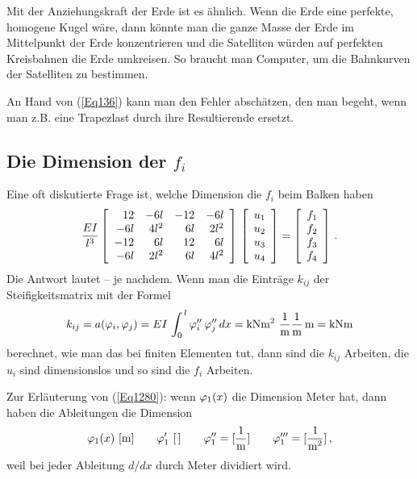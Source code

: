 Mit der Anziehungskraft der Erde ist es \"{a}hnlich. Wenn die Erde eine perfekte, homogene Kugel w\"{a}re, dann k\"{o}nnte man die ganze Masse der Erde im Mittelpunkt der Erde konzentrieren und die Satelliten w\"{u}rden auf perfekten Kreisbahnen die Erde umkreisen. So braucht man Computer, um die Bahnkurven der Satelliten zu bestimmen.

An Hand von (\ref{Eq136}) kann man den Fehler absch\"{a}tzen, den man begeht, wenn man z.B. eine Trapezlast durch ihre Resultierende ersetzt.

\textcolor{sectionTitleBlue}{\subsection{Die Dimension der $f_i$}}\label{Dimensionsbetrachtung}
Eine oft diskutierte Frage ist, welche Dimension die $f_i$ beim Balken haben
\begin{align}
 \frac{EI}{l^3} \left[
\begin{array}{r r r r}
 12 & -6l & -12 &-6l \\
 -6l & 4l^2 & 6l &2l^2 \\
 -12 & 6l & 12 & 6l \\
 -6l &2l^2 &6l &4l^2
 \end{array}
  \right]\,\left [\barr{c} u_1 \\ u_2 \\ u_3 \\ u_4 \earr \right ] = \left [\barr{c}  f_1 \\ f_2 \\ f_3 \\ f_4 \earr \right ]\,.
\end{align}
Die Antwort lautet -- je nachdem. Wenn man die Eintr\"{a}ge $k_{ij}$ der Steifigkeitsmatrix mit der Formel
\begin{align}\label{Eq1280}
k_{ij } = a(\Np_i,\Np_j) = EI\,\int_0^{\,l} \Np_i''\,\Np_j''\,dx = \text{kNm$^2$ } \frac{1}{\text{m}}\frac{1}{\text{m}}\,\text{m} = \text{kNm}
\end{align}
berechnet, wie man das bei finiten Elementen tut, dann sind die $k_{ij}$ Arbeiten, die $u_i$ sind dimensionslos und so sind die $f_i$ Arbeiten.

Zur Erl\"{a}uterung von (\ref{Eq1280}): wenn $\Np_1(x)$ die Dimension Meter hat, dann haben die Ableitungen die Dimension
\begin{align}
\Np_1(x) \,\,\text{[m]} \qquad \Np_1'\,\,[\,] \qquad\Np_1'' = [\frac{1}{\text{m}}] \qquad\Np_1''' = [\frac{1}{\text{m$^2$}}]\,,
\end{align}
weil bei jeder Ableitung $d/dx$ durch Meter dividiert wird.


